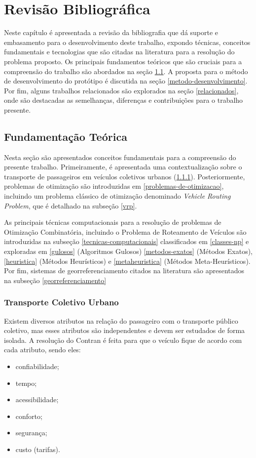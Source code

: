 \chapter{Revisão Bibliográfica}

Neste capítulo é apresentada a revisão da bibliografia que dá suporte e embasamento para o desenvolvimento deste trabalho, expondo técnicas, conceitos fundamentais e tecnologias que são citadas na literatura para a resolução do problema proposto. Os principais fundamentos teóricos que são cruciais para a compreensão do trabalho são abordados na seção \ref{fundamentacao}. A proposta para o método de desenvolvimento do protótipo é discutida na seção \ref{metodo-desenvolvimento}. Por fim, alguns trabalhos relacionados são explorados na seção \ref{relacionados}, onde são destacadas as semelhanças, diferenças e contribuições para o trabalho presente.

\section{Fundamentação Teórica}\label{fundamentacao}
Nesta seção são apresentados conceitos fundamentais para a compreensão do presente trabalho. Primeiramente, é apresentada uma contextualização sobre o transporte de passageiros em veículos coletivos urbanos (\ref{transporte-urbano}). Posteriormente, problemas de otimização são introduzidas em \ref{problemas-de-otimizacao}, incluindo um problema clássico de otimização denominado \emph{Vehicle Routing Problem}, que é detalhado na subseção \ref{vrp}. 

As principais técnicas computacionais para a resolução de problemas de Otimização Combinatória, incluindo o Problema de Roteamento de Veículos são introduzidas na subseção \ref{tecnicas-computacionais} classificados em \ref{classes-np} e exploradas em \ref{gulosos} (Algoritmos Gulosos) \ref{metodos-exatos} (Métodos Exatos), \ref{heuristica} (Métodos Heurísticos) e \ref{metaheuristica} (Métodos Meta-Heurísticos). Por fim, sistemas de georreferenciamento citados na literatura são apresentados na subseção \ref{georreferenciamento}

\subsection{Transporte Coletivo Urbano}\label{transporte-urbano}
Existem diversos atributos na relação do passageiro com o transporte público coletivo, mas esses atributos são independentes e devem ser estudados de forma isolada. A resolução do Contran \cite{denatran} é feita para que o veículo fique de acordo com cada atributo, sendo eles:
\begin{itemize}
    \item confiabilidade;
    \item tempo;
    \item acessibilidade;
    \item conforto;
    \item segurança;
    \item custo (tarifas).
\end{itemize}

